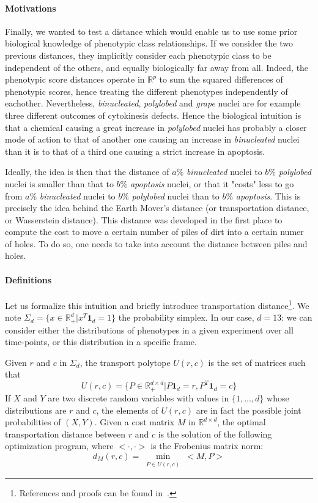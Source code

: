 \paragraph{Motivations}
Finally, we wanted to test a distance which would enable us to use some prior biological knowledge of phenotypic class relationships. If we consider the two previous distances, they implicitly consider each phenotypic class to be independent of the others, and equally biologically far away from all. Indeed, the phenotypic score distances operate in $\mathbb{R}^p$ to sum the squared differences of phenotypic scores, hence treating the different phenotypes independently of eachother. Nevertheless, \textit{binucleated}, \textit{polylobed} and \textit{grape} nuclei are for example three different outcomes of cytokinesis defects. Hence the biological intuition is that a chemical causing a great increase in \textit{polylobed} nuclei has probably a closer mode of action to that of another one causing an increase in \textit{binucleated} nuclei than it is to that of a third one causing a strict increase in apoptosis.

Ideally, the idea is then that the distance of $a\%$ \textit{binucleated} nuclei to $b\%$ \textit{polylobed} nuclei is smaller than that to $b\%$ \textit{apoptosis} nuclei, or that it "costs" less to go from $a\%$ \textit{binucleated} nuclei to $b\%$ \textit{polylobed} nuclei than to $b\%$ \textit{apoptosis}. This is precisely the idea behind the Earth Mover's distance (or transportation distance, or Wasserstein distance). This distance was developed in the first place to compute the cost to move a certain number of piles of dirt into a certain numer of holes. To do so, one needs to take into account the distance between piles and holes.
\paragraph{Definitions}
Let us formalize this intuition and briefly introduce transportation distance\footnote{References and proofs can be found in~\cite{sinkhorn}.}. We note $\Sigma_d = \{ x \in \mathbb{R}^d_+ | x^T \mathbf{1}_d = 1\}$ the probability simplex. In our case, $d=13$: we can consider either the distributions of phenotypes in a given experiment over all time-points, or this distribution in a specific frame.

Given $r$ and $c$ in $\Sigma_d$, the transport polytope $U(r,c)$ is the set of matrices such that 
\[
U(r,c)=\{ P\in \mathbb{R}^{d\times d}_+ | P\mathbf{1}_d = r, P^T \mathbf{1}_d = c \}\] 
If $X$ and $Y$ are two discrete random variables with values in $ \{1,\ldots , d\} $ whose distributions are $r$ and $c$, the elements of $U(r,c)$ are in fact the possible joint probabilities of $\left( X,Y\right)$. Given a cost matrix $M$ in $\mathbb{R}^{d\times d}$, the optimal transportation distance between $r$ and $c$ is the solution of the following optimization program, where $<\cdot, \cdot> $ is the Frobenius matrix norm:
\begin{equation}
d_M(r,c) = \min_{\substack{P\in U(r,c)}} <M,P>
\label{exact_emd}
\end{equation}

